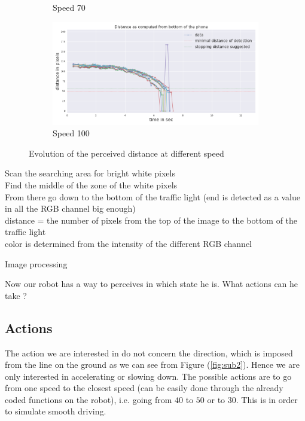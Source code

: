 \documentclass[14pt,a4paper]{article}
\theoremstyle{definition}
\begin{document}
\begin{figure}[h]
\begin{subfigure}[b]{0.475\textwidth}
            \caption[]%
            {{\small Speed 70}}    
            \label{fig:mean and std of net34}
        \end{subfigure}
        \quad
        \begin{subfigure}[b]{0.475\textwidth}   
            \centering 
            \includegraphics[width=\textwidth]{img/dist100.png}
            \caption[]%
            {{\small Speed 100}}    
            \label{fig:mean and std of net44}
        \end{subfigure}
        \caption{{\small Evolution of the perceived distance at different speed}}
	\label{distance_plots}
\end{figure}

\begin{algorithm}
    
	
	Scan the searching area for bright white pixels\\
	Find the middle of the zone of the white pixels\\
    From there go down to the bottom of the traffic light (end is detected as a value in all the RGB channel big enough)\\
    distance = the number of pixels from the top of the image to the bottom of the traffic light\\
    color is determined from the intensity of the different RGB channel
	\caption{Image processing}
	\label{detection_image}
\end{algorithm}

Now our robot has a way to perceives in which state he is. What actions can he take ? 


\subsection{Actions}
The action we are interested in do not concern the direction, which is imposed from the line on the ground as we can see from Figure (\ref{fig:sub2}). Hence we are only interested in accelerating or slowing down. The possible actions are to go from one speed to the closest speed (can be easily done through the already coded functions on the robot), i.e. going from $40$ to $50$ or to $30$. This is in order to simulate smooth driving.
\end{document}
